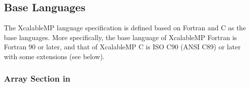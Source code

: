 \subsection{Base Languages}

The XcalableMP language specification is defined based on Fortran
and C as the base languages. More specifically, the base language of
XcalableMP Fortran is Fortran 90 or later, and that of XcalableMP C is
ISO C90 (ANSI C89) or later with some extensions (see below).

\subsubsection{Array Section in {\XMPC}}











